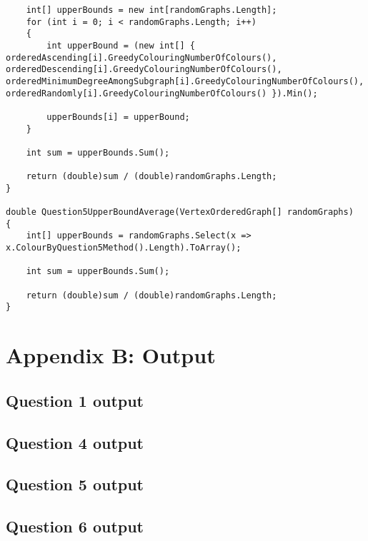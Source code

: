 \documentclass{article}
\begin{document}
\begin{lstlisting}
	int[] upperBounds = new int[randomGraphs.Length];
	for (int i = 0; i < randomGraphs.Length; i++)
	{
		int upperBound = (new int[] { orderedAscending[i].GreedyColouringNumberOfColours(), orderedDescending[i].GreedyColouringNumberOfColours(), orderedMinimumDegreeAmongSubgraph[i].GreedyColouringNumberOfColours(), orderedRandomly[i].GreedyColouringNumberOfColours() }).Min();
		
		upperBounds[i] = upperBound;
	}
	
	int sum = upperBounds.Sum();
	
	return (double)sum / (double)randomGraphs.Length;
}

double Question5UpperBoundAverage(VertexOrderedGraph[] randomGraphs)
{
	int[] upperBounds = randomGraphs.Select(x => x.ColourByQuestion5Method().Length).ToArray();
	
	int sum = upperBounds.Sum();
	
	return (double)sum / (double)randomGraphs.Length;
}
\end{lstlisting}
				
\newpage
\section{Appendix B: Output}
\label{appendix_b_output}
				
\subsection{Question 1 output}
\label{output_question_1}


\subsection{Question 4 output}
\label{output_question_4}


\subsection{Question 5 output}
\label{output_question_5}



\subsection{Question 6 output}
\label{output_question_6}

\end{document}
